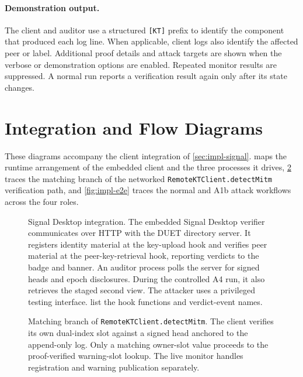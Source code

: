\paragraph{Demonstration output.}
The client and auditor use a structured \texttt{[KT]} prefix to identify the component that
produced each log line. When applicable, client logs also identify the affected peer or label. Additional proof
details and attack targets are shown when the verbose or demonstration options are enabled.
Repeated monitor results are suppressed. A normal run reports a verification result again only
after its state changes.

\FloatBarrier
\section{Integration and Flow Diagrams}\label{sec:apiref-diagrams}

These diagrams accompany the client integration of \cref{sec:impl-signal}. 
maps the runtime arrangement of the embedded client and the three processes it drives,
\cref{fig:impl-verify} traces the matching branch of the networked
\texttt{RemoteKTClient.detectMitm} verification path, and \cref{fig:impl-e2e} traces the normal and
A1b attack workflows across the four roles.

\begin{figure}[ht]
\centering

\caption[Signal Desktop integration points.]{Signal Desktop integration. The embedded Signal Desktop verifier communicates over HTTP with the DUET directory server. It registers identity material at the
key-upload hook and verifies peer material at the peer-key-retrieval hook, reporting verdicts to the
badge and banner. An auditor process polls the server for signed heads and epoch disclosures. During
the controlled A4 run, it also retrieves the staged second view. The attacker uses a privileged
testing interface.  list the hook functions and verdict-event names.}
\label{fig:impl-signal}
\end{figure}

\begin{figure}[H]
\centering

\caption[Owner-slot and warning-slot verification.]{Matching branch of
\texttt{RemoteKTClient.detectMitm}. The client verifies its own dual-index slot against a signed
head anchored to the append-only log. Only a matching owner-slot value proceeds to the proof-verified
warning-slot lookup. The live monitor handles registration and warning publication separately.}
\label{fig:impl-verify}
\end{figure}

